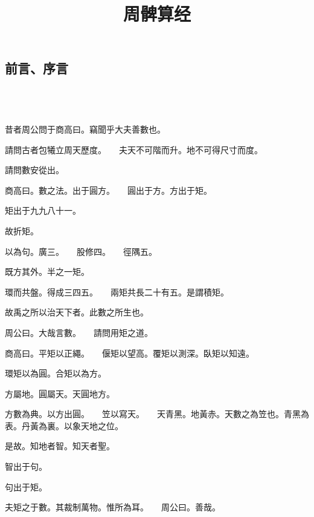 \documentclass[a4paper,12pt,UTF8,twoside]{ctexbook}
\title{\heiti\zihao{0} 周髀算经}
\author{}
\date{}
\begin{document}
\maketitle
\tableofcontents

\frontmatter
\chapter{前言、序言}

\mainmatter

~\\

 \qquad  

\part{}

\chapter{}

昔者周公問于商高曰。竊聞乎大夫善數也。

請問古者包犧立周天歷度。　　夫天不可階而升。地不可得尺寸而度。

請問數安從出。

商高曰。數之法。出于圓方。　　圓出于方。方出于矩。

矩出于九九八十一。

故折矩。

以為句。廣三。　　股修四。　　徑隅五。

既方其外。半之一矩。

環而共盤。得成三四五。　　兩矩共長二十有五。是謂積矩。

故禹之所以治天下者。此數之所生也。

周公曰。大哉言數。　　請問用矩之道。

商高曰。平矩以正繩。　　偃矩以望高。覆矩以測深。臥矩以知遠。

環矩以為圓。合矩以為方。

方屬地。圓屬天。天圓地方。

方數為典。以方出圓。　　笠以寫天。　　天青黑。地黃赤。天數之為笠也。青黑為表。丹黃為裏。以象天地之位。

是故。知地者智。知天者聖。

智出于句。

句出于矩。

夫矩之于數。其裁制萬物。惟所為耳。　　周公曰。善哉。
\end{document}
